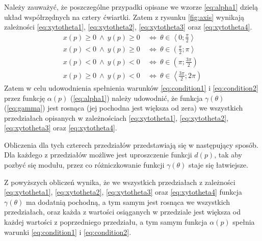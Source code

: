      Należy zauważyć, że poszczególne przypadki opisane we wzorze \ref{eq:alpha1} dzielą układ współrzędnych na cztery ćwiartki. Zatem z rysunku \ref{fig:axis} wynikają zależności
     \ref{eq:xytotheta1}, 
     \ref{eq:xytotheta2}, 
     \ref{eq:xytotheta3} oraz
     \ref{eq:xytotheta4}.
     \begin{align}\label{eq:xytotheta1}
    		x\left(p\right) \geqslant 0 \ \wedge \  y\left(p\right) \geqslant 0  \ & \Leftrightarrow \ \theta \in \left\langle 0;\frac{\pi}{2}\right\rangle \\
    		\label{eq:xytotheta2}
    		x\left(p\right) < 0 \ \wedge \ y\left(p\right) \geqslant 0 \ & \Leftrightarrow \
  		\theta \in \left( \frac{\pi}{2};\pi\right\rangle\\
  		\label{eq:xytotheta3}
    		x\left(p\right) < 0 \ \wedge \ y\left(p\right) < 0 \ & \Leftrightarrow \
  		\theta \in \left( \pi;\frac{3\pi}{2}\right)\\
  		\label{eq:xytotheta4}
  		x\left(p\right) \geqslant 0 \ \wedge \ y\left(p\right) < 0 \ & \Leftrightarrow \
  	\theta \in \left\langle
  		\frac{
  			3\pi
  		}{
  			2
  		};
  		2\pi
  	\right)
    \end{align}
    Zatem w celu udowodnienia spełnienia warunków \ref{eq:condition1} i \ref{eq:condition2} przez funkcję $\alpha\left(p\right)$ (\ref{eq:alpha1}) należy udowodnić, że funkcja $\gamma\left(\theta\right)$ (\ref{eq:gamma}) jest rosnąca (jej pochodna jest większa od zera) we wszystkich przedziałach opisanych w zależnościach
     \ref{eq:xytotheta1}, 
     \ref{eq:xytotheta2}, 
     \ref{eq:xytotheta3} oraz
     \ref{eq:xytotheta4}.
    
    Obliczenia dla tych czterech przedziałów przedstawiają się w następujący sposób. Dla każdego z przedziałów możliwe jest uproszczenie funkcji $d\left(p\right)$, tak aby pozbyć się modułu, przez co różniczkowanie funkcji $\gamma\left(\theta\right)$ staje się łatwiejsze.
 
    
    
    Z powyższych obliczeń wynika, że we wszystkich przedziałach z zależności
     \ref{eq:xytotheta1}, 
     \ref{eq:xytotheta2}, 
     \ref{eq:xytotheta3} oraz
     \ref{eq:xytotheta4} funkcja $\gamma\left(\theta\right)$ ma dodatnią pochodną, a tym samym jest rosnąca we wszystkich przedziałach, oraz każda z wartości osiąganych w przedziale jest większa od każdej wartości z poprzedniego przedziału, a tym samym funkcja $\alpha\left(p\right)$ spełnia warunki \ref{eq:condition1} i \ref{eq:condition2}.
     
